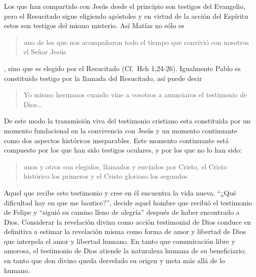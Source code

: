 Los que han compartido con Jesús desde el principio son testigos del Evangelio, pero el Resucitado sigue eligiendo apóstoles y en virtud de la acción del Espíritu estos son testigos del mismo misterio\autocite[Cf.~][576]{ninot2009tf}. Así Matías no sólo es \blockquote[][\,(Hch 1,21)]{uno de los que nos acompañaron todo el tiempo que convivió con nosotros el Señor Jesús}, sino que es elegido por el Resucitado (Cf.~Hch 1,24-26). Igualmente Pablo es constituido testigo por la llamada del Resucitado, así puede decir \blockquote[][\,(1Cor 2,1)]{Yo mismo hermanos cuando vine a vosotros a anunciaros el testimonio de Dios\ldots}. De este modo la transmisión viva del testimonio cristiano esta constituida por un momento fundacional en la convivencia con Jesús y un momento continuante como dos aspectos históricos inseparables.\autocite[Cf.~][148]{prades2015testimonio} Este momento continuante está compuesto por los que han sido testigos oculares, y por los que no lo han sido: \blockquote[{\cite[148]{prades2015testimonio}}]{unos y otros son elegidos, llamados y enviados por Cristo, el Cristo histórico los primeros y el Cristo glorioso los segundos}. Aquel que recibe este testimonio y cree en él encuentra la vida nueva. ``¿Qué dificultad hay en que me bautice?'', decide aquel hombre que recibió el testimonio de Felipe y ``siguió su camino lleno de alegría'' después de haber encontrado a Dios. Considerar la revelación divina como acción testimonial de Dios conduce en definitiva a estimar la revelación misma como forma de amor y libertad de Dios que interpela el amor y libertad humano. En tanto que comunicación libre y amorosa, el testimonio de Dios atiende la naturaleza humana de su beneficiario; en tanto que don divino queda desvelado su origen y meta más allá de lo humano\autocite[Cf.][152]{prades2015testimonio}.
